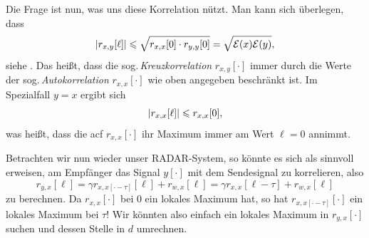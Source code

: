 Die Frage ist nun, was uns diese Korrelation nützt.
Man kann sich überlegen, dass
\[
{\left| r_{x,y}[\ell] \right|} 
    \leqslant \sqrt{
        r_{x,x}[0] \cdot r_{y,y}[0] 
    }
    = \sqrt{
        \mathcal{E}(x) \mathcal{E}(y)
    },
\]
siehe .
Das heißt, dass die sog.\,\emph{Kreuzkorrelation} $r_{x,y}[\cdot]$ immer durch die Werte der sog.\,\emph{Autokorrelation} $r_{x,x}[\cdot]$ wie oben angegeben beschränkt ist.
Im Spezialfall $y=x$ ergibt sich
\[
{\left| r_{x,x}[\ell] \right|} \leqslant r_{x,x}[0],
\]
was heißt, dass die \gls{acf} $r_{x,x}[\cdot]$ ihr Maximum immer am Wert $\ell=0$ annimmt.

Betrachten wir nun wieder unser RADAR-System, so könnte es sich als sinnvoll erweisen, am Empfänger das Signal $y[\cdot]$ mit dem Sendesignal zu korrelieren, also
\[
r_{y,x}[\ell] 
    = \gamma r_{x,x[\cdot-\tau]}[\ell] + r_{w,x}[\ell]
    = \gamma r_{x,x}[\ell-\tau] + r_{w,x}[\ell]
\]
zu berechnen.
Da $r_{x,x}[\cdot]$ bei $0$ ein lokales Maximum hat, so hat $r_{x,x[\cdot-\tau]}[\cdot]$ ein lokales Maximum bei $\tau$!
Wir könnten also einfach ein lokales Maximum in $r_{y,x}[\cdot]$ suchen und dessen Stelle in $d$ umrechnen.

